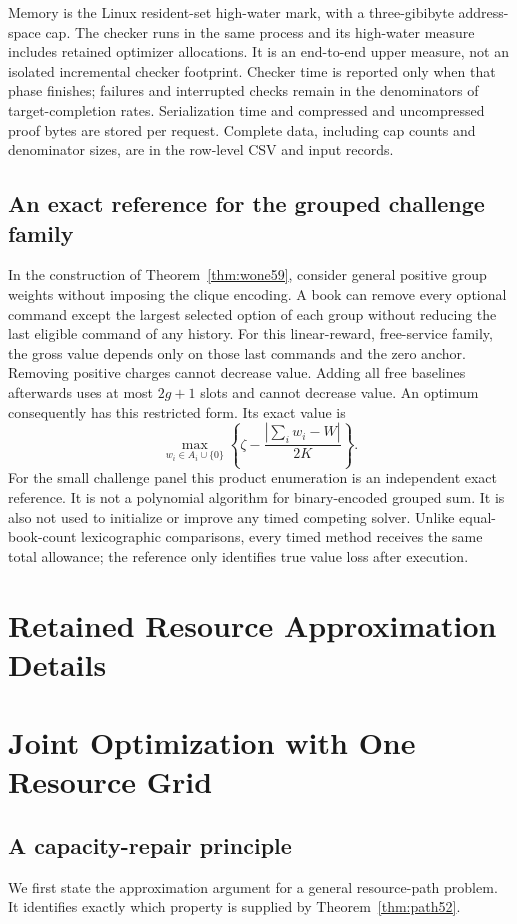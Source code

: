 \documentclass[11pt,letterpaper]{article}
\theoremstyle{definition}\newtheorem{remark}[theorem]{Remark}
\begin{document}
Memory is the Linux resident-set high-water mark, with a three-gibibyte address-space cap. The checker runs in the same process and its high-water measure includes retained optimizer allocations. It is an end-to-end upper measure, not an isolated incremental checker footprint. Checker time is reported only when that phase finishes; failures and interrupted checks remain in the denominators of target-completion rates. Serialization time and compressed and uncompressed proof bytes are stored per request. Complete data, including cap counts and denominator sizes, are in the row-level CSV and input records.

\subsection{An exact reference for the grouped challenge family}
In the construction of Theorem~\ref{thm:wone59}, consider general positive group weights without imposing the clique encoding. A book can remove every optional command except the largest selected option of each group without reducing the last eligible command of any history. For this linear-reward, free-service family, the gross value depends only on those last commands and the zero anchor. Removing positive charges cannot decrease value. Adding all free baselines afterwards uses at most $2g+1$ slots and cannot decrease value. An optimum consequently has this restricted form. Its exact value is
\[
 \max_{w_i\in A_i\cup\{0\}}\left\{\zeta-\frac{|\sum_iw_i-W|}{2K}\right\}.
\]
For the small challenge panel this product enumeration is an independent exact reference. It is not a polynomial algorithm for binary-encoded grouped sum. It is also not used to initialize or improve any timed competing solver. Unlike equal-book-count lexicographic comparisons, every timed method receives the same total allowance; the reference only identifies true value loss after execution.
\section{Retained Resource Approximation Details}
\section{Joint Optimization with One Resource Grid}\label{sec:algorithm52}
\subsection{A capacity-repair principle}
We first state the approximation argument for a general resource-path problem. It identifies exactly which property is supplied by Theorem~\ref{thm:path52}.
\end{document}
